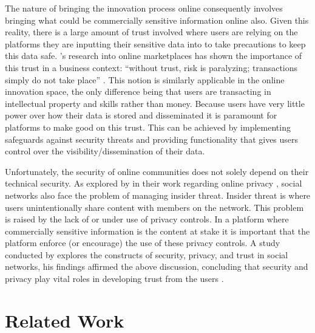 The nature of bringing the innovation process online consequently involves bringing what could be commercially sensitive information online also. Given this reality, there is a large amount of trust involved where users are relying on the platforms they are inputting their sensitive data into to take precautions to keep this data safe. \citeauthor{boyd2002community}'s research into online marketplaces has shown the importance of this trust in a business context: ``without trust, risk is paralyzing; transactions simply do not take place'' \cite{boyd2002community}. This notion is similarly applicable in the online innovation space, the only difference being that users are transacting in intellectual property and skills rather than money. Because users have very little power over how their data is stored and disseminated it is paramount for platforms to make good on this trust. This can be achieved by implementing safeguards against security threats and providing functionality that gives users control over the visibility/dissemination of their data.

Unfortunately, the security of online communities does not solely depend on their technical security. As explored by \citeauthor{johnson2012facebook} in their work regarding online privacy \cite{johnson2012facebook}, social networks also face the problem of managing insider threat. Insider threat is where users unintentionally share content with members on the network. This problem is raised by the lack of or under use of privacy controls. In a platform where commercially sensitive information is the content at stake it is important that the platform enforce (or encourage) the use of these privacy controls. A study conducted by \citeauthor{shin2010effects} explores the constructs of security, privacy, and trust in social networks, his findings affirmed the above discussion, concluding that security and privacy play vital roles in developing trust from the users \cite{shin2010effects}.

\section{Related Work}

